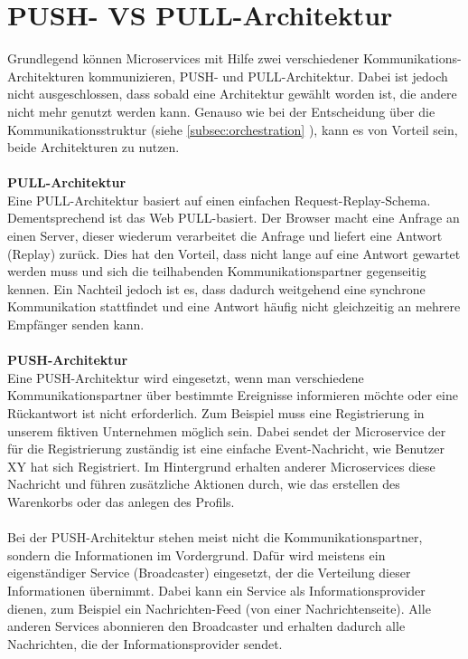 \section{PUSH- VS PULL-Architektur}
\label{sec:PushPullArchitektur}
Grundlegend können Microservices mit Hilfe zwei verschiedener Kommunikations-Architekturen kommunizieren, PUSH- und PULL-Architektur. Dabei ist jedoch nicht ausgeschlossen, dass sobald eine Architektur gewählt worden ist, die andere nicht mehr genutzt werden kann. Genauso wie bei der Entscheidung über die Kommunikationsstruktur (siehe \ref{subsec:orchestration} ), kann es von Vorteil sein, beide Architekturen zu nutzen.
\\\\
\textbf{PULL-Architektur}\\
Eine PULL-Architektur basiert auf einen einfachen Request-Replay-Schema. Dementsprechend ist das Web PULL-basiert.
Der Browser macht eine Anfrage an einen Server, dieser wiederum verarbeitet die Anfrage und liefert eine Antwort (Replay) zurück. Dies hat den Vorteil, dass nicht lange auf eine Antwort gewartet werden muss und sich die teilhabenden Kommunikationspartner gegenseitig kennen. Ein Nachteil jedoch ist es, dass dadurch weitgehend eine synchrone Kommunikation stattfindet und eine Antwort häufig nicht gleichzeitig an mehrere Empfänger senden kann.
\\\\
\textbf{PUSH-Architektur}\\
Eine PUSH-Architektur wird eingesetzt, wenn man verschiedene Kommunikationspartner über bestimmte Ereignisse informieren möchte oder eine Rückantwort ist nicht erforderlich. Zum Beispiel muss eine Registrierung in unserem fiktiven Unternehmen möglich sein. Dabei sendet der Microservice der für die Registrierung zuständig ist eine einfache Event-Nachricht, wie Benutzer XY hat sich Registriert. Im Hintergrund erhalten anderer Microservices diese Nachricht und führen zusätzliche Aktionen durch, wie das erstellen des Warenkorbs oder das anlegen des Profils.
\\\\
Bei der PUSH-Architektur stehen meist nicht die Kommunikationspartner, sondern die Informationen im Vordergrund. Dafür wird meistens ein eigenständiger Service (Broadcaster) eingesetzt, der die Verteilung dieser Informationen übernimmt. Dabei kann ein Service als Informationsprovider dienen, zum Beispiel ein Nachrichten-Feed (von einer Nachrichtenseite). Alle anderen Services abonnieren den Broadcaster und erhalten dadurch alle Nachrichten, die der Informationsprovider sendet.
